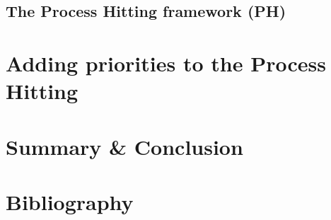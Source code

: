 \documentclass[fleqn,8pt,t]{beamer}
\begin{document}
\subsection{The Process Hitting framework (PH)}
%
%
%

\section{Adding priorities to the Process Hitting}




\section{Summary \& Conclusion}


\appendix
\section[x]{Bibliography}

%
\end{document}
